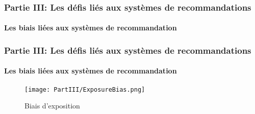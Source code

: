 \begin{frame}

    \frametitle{Partie III: Les défis liés aux systèmes de recommandations}
    \framesubtitle{Les biais liées aux systèmes de recommandation}

    \begin{figure}
        \centering
    \end{figure}

\end{frame}

\begin{frame}

    \frametitle{Partie III: Les défis liés aux systèmes de recommandations}
    \framesubtitle{Les biais liées aux systèmes de recommandation}

    \begin{figure}
        \centering
        \texttt{[image: PartIII/ExposureBias.png]}
        \caption{Biais d'exposition}
    \end{figure}

\end{frame}

